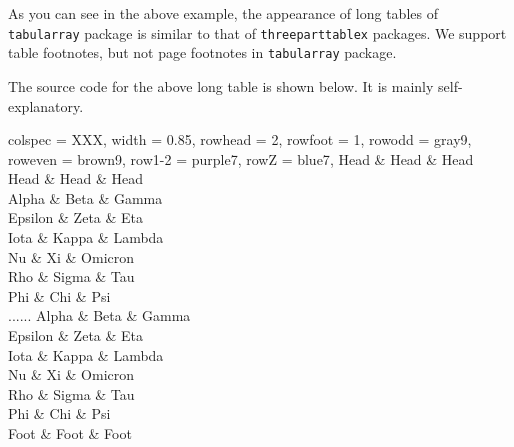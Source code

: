 \documentclass[oneside]{book}
\begin{document}
As you can see in the above example, the appearance of long tables of \verb!tabularray! package
is similar to that of \verb!threeparttablex! packages.
We support table footnotes, but not page footnotes in \verb!tabularray! package.

\newpage

The source code for the above long table is shown below. It is mainly self-explanatory.

\begin{codehigh}
\begin{longtblr}[
  theme = fancy,
  caption = {A Long Long Long Long Long Long Long Table},
  entry = {Short Caption},
  label = {tblr:test},
  note{a} = {It is the first footnote.},
  note{$\dag$} = {It is the second long long long long long long footnote.},
  remark{Note} = {Some general note. Some general note. Some general note.},
  remark{Source} = {Made up by myself. Made up by myself. Made up by myself.},
]{
  colspec = {XXX}, width = 0.85\linewidth,
  rowhead = 2, rowfoot = 1,
  row{odd} = {gray9}, row{even} = {brown9},
  row{1-2} = {purple7}, row{Z} = {blue7},
}
\hline
 Head    & Head  & Head    \\
\hline
 Head    & Head  & Head    \\
\hline
 Alpha   & Beta  & Gamma   \\
\hline
 Epsilon & Zeta       & Eta    \\
\hline
 Iota    & Kappa\TblrNote{$\dag$} & Lambda \\
\hline
 Nu      & Xi    & Omicron \\
\hline
 Rho     & Sigma & Tau     \\
\hline
 Phi     & Chi   & Psi     \\
\hline
......
\hline
 Alpha   & Beta  & Gamma   \\
\hline
 Epsilon & Zeta  & Eta     \\
\hline
 Iota    & Kappa & Lambda  \\
\hline
 Nu      & Xi    & Omicron \\
\hline
 Rho     & Sigma & Tau     \\
\hline
 Phi     & Chi   & Psi     \\
\hline
 Foot    & Foot  & Foot    \\
\hline
\end{longtblr}
\end{codehigh}
\end{document}
